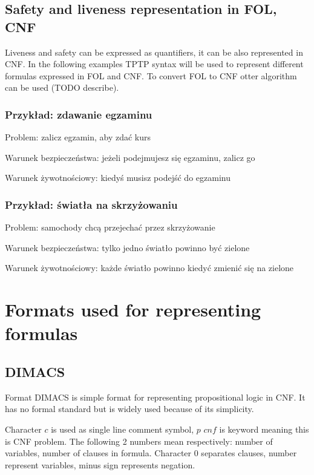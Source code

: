 \subsection{Safety and liveness representation in FOL, CNF}

Liveness and safety can be expressed as quantifiers, it can be also represented in \gls{CNF}.
In the following examples TPTP syntax will be used to represent different formulas expressed in \gls{FOL} and \gls{CNF}. To convert \gls{FOL} to \gls{CNF} otter algorithm can be used (TODO describe).

\subsubsection{Przykład: zdawanie egzaminu}

\noindent
Problem: zalicz egzamin, aby zdać kurs

\noindent
Warunek bezpieczeństwa: jeżeli podejmujesz się egzaminu, zalicz go

\noindent
Warunek żywotnościowy: kiedyś musisz podejść do egzaminu

\subsubsection{Przykład: światła na skrzyżowaniu}

\noindent
Problem: samochody chcą przejechać przez skrzyżowanie

\noindent
Warunek bezpieczeństwa: tylko jedno światło powinno być zielone

\noindent
Warunek żywotnościowy: każde światło powinno kiedyć zmienić się na zielone

\section{Formats used for representing formulas}

\subsection{DIMACS}

Format DIMACS is simple format for representing propositional logic in \gls{CNF}. It has no formal standard but is widely used because of its simplicity.

Character $c$ is used as single line comment symbol, $p$ $cnf$ is keyword meaning this is \gls{CNF} problem. The following 2 numbers mean respectively: number of variables, number of clauses in formula.  Character $0$ separates clauses, number represent variables, minus sign represents negation.


